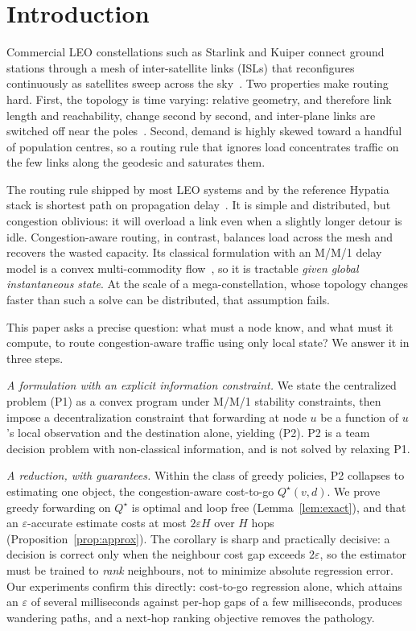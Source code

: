 \documentclass[conference]{IEEEtran}
\begin{document}
\section{Introduction}
Commercial LEO constellations such as Starlink and Kuiper connect ground stations through a mesh of inter-satellite links (ISLs) that reconfigures continuously as satellites sweep across the sky~\cite{handley2018delay,kassing2020hypatia}. Two properties make routing hard. First, the topology is time varying: relative geometry, and therefore link length and reachability, change second by second, and inter-plane links are switched off near the poles~\cite{bhattacherjee2019topology}. Second, demand is highly skewed toward a handful of population centres, so a routing rule that ignores load concentrates traffic on the few links along the geodesic and saturates them.

The routing rule shipped by most LEO systems and by the reference Hypatia stack is shortest path on propagation delay~\cite{kassing2020hypatia}. It is simple and distributed, but congestion oblivious: it will overload a link even when a slightly longer detour is idle. Congestion-aware routing, in contrast, balances load across the mesh and recovers the wasted capacity. Its classical formulation with an M/M/1 delay model is a convex multi-commodity flow~\cite{kleinrock1975queueing,bertsekas1992data}, so it is tractable \emph{given global instantaneous state}. At the scale of a mega-constellation, whose topology changes faster than such a solve can be distributed, that assumption fails.

This paper asks a precise question: what must a node know, and what must it compute, to route congestion-aware traffic using only local state? We answer it in three steps.

\emph{A formulation with an explicit information constraint.} We state the centralized problem (P1) as a convex program under M/M/1 stability constraints, then impose a decentralization constraint that forwarding at node $u$ be a function of $u$'s local observation and the destination alone, yielding (P2). P2 is a team decision problem with non-classical information, and is not solved by relaxing P1.

\emph{A reduction, with guarantees.} Within the class of greedy policies, P2 collapses to estimating one object, the congestion-aware cost-to-go $Q^\star(v,d)$. We prove greedy forwarding on $Q^\star$ is optimal and loop free (Lemma~\ref{lem:exact}), and that an $\varepsilon$-accurate estimate costs at most $2\varepsilon H$ over $H$ hops (Proposition~\ref{prop:approx}). The corollary is sharp and practically decisive: a decision is correct only when the neighbour cost gap exceeds $2\varepsilon$, so the estimator must be trained to \emph{rank} neighbours, not to minimize absolute regression error. Our experiments confirm this directly: cost-to-go regression alone, which attains an $\varepsilon$ of several milliseconds against per-hop gaps of a few milliseconds, produces wandering paths, and a next-hop ranking objective removes the pathology.
\end{document}
